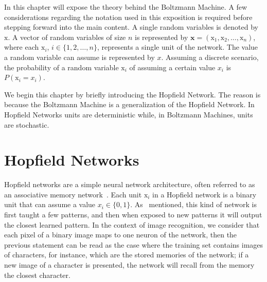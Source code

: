 %
%
%
%

In this chapter will expose the theory behind the Boltzmann Machine.
A few considerations regarding the notation used in this exposition is required before stepping forward into the main content.
A single random variables is denoted by $\mathrm{x}$.
A vector of random variables of size $n$ is represented by $\mathbf{x} = (\mathrm{x}_{1}, \mathrm{x}_{2}, \dots, \mathrm{x}_{n})$, where each $\mathrm{x}_{i}$, $i \in \{1, 2, \dots, n\}$, represents a single unit of the network.
The value a random variable can assume is represented by $x$.
Assuming a discrete scenario, the probability of a random variable $\mathrm{x}_{i}$ of assuming a certain value $x_{i}$ is $P(\mathrm{x}_{i} = x_{i})$.

We begin this chapter by briefly introducing the Hopfield Network.
The reason is because the Boltzmann Machine is a generalization of the Hopfield Network.
In Hopfield Networks units are deterministic while, in Boltzmann Machines, units are stochastic.


\section{Hopfield Networks}%
\label{ch:bm:hopfield}%

Hopfield networks are a simple neural network architecture, often referred to as an associative memory network~\cite{bib:hertz1991}.
Each unit $\mathrm{x}_{i}$ in a Hopfield network is a binary unit that can assume a value $x_{i} \in \{0, 1\}$.
As~ mentioned, this kind of network is first taught a few patterns, and then when exposed to new patterns it will output the closest learned pattern.
In the context of image recognition, we consider that each pixel of a binary image maps to one neuron of the network, then the previous statement can be read as the case where the training set contains images of characters, for instance, which are the stored memories of the network; if a new image of a character is presented, the network will recall from the memory the closest character.

